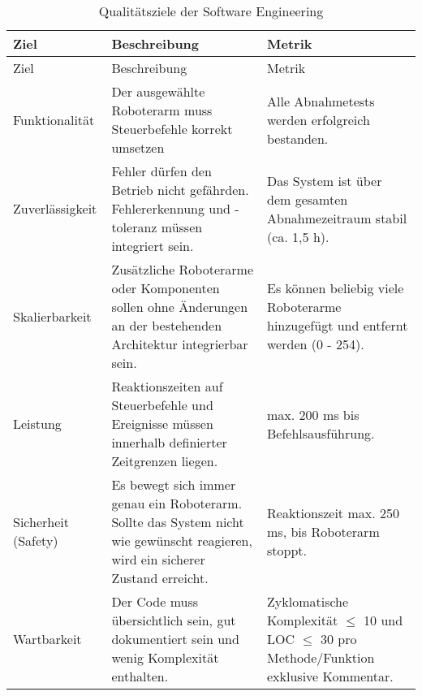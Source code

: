 \begin{longtable}{|>{\raggedright\arraybackslash}p{4cm}|>{\raggedright\arraybackslash}p{5cm}|>{\raggedright\arraybackslash}p{5cm}|}
	\caption{Qualitätsziele der Software Engineering} \label{tab:seziele} \\
	\hline
	Ziel & Beschreibung & Metrik \\
	\hline
	\endfirsthead
	
	\hline
	Ziel & Beschreibung & Metrik \\
	\hline
	\endhead
	
	\hline  
	\endfoot
   
        Funktionalität &  
        Der ausgewählte Roboterarm muss Steuerbefehle korrekt umsetzen
        & Alle Abnahmetests werden erfolgreich bestanden.
        \\
        \hline
        Zuverlässigkeit & 
        Fehler dürfen den Betrieb nicht gefährden. Fehlererkennung und -toleranz müssen integriert sein.
        & Das System ist über dem gesamten Abnahmezeitraum stabil (ca. 1,5 h).
        \\
        \hline
        Skalierbarkeit & 
        Zusätzliche Roboterarme oder Komponenten sollen ohne Änderungen an der bestehenden Architektur integrierbar sein. 
        & Es können beliebig viele Roboterarme hinzugefügt und entfernt werden (0 - 254).
        \\
        \hline
        Leistung & 
        Reaktionszeiten auf Steuerbefehle und Ereignisse müssen innerhalb definierter Zeitgrenzen liegen. 
        & max. 200 ms bis Befehlsausführung.
        \\
        \hline
        Sicherheit (Safety) & 
        Es bewegt sich immer genau ein Roboterarm. Sollte das System nicht wie gewünscht reagieren, wird ein sicherer Zustand erreicht.
        & Reaktionszeit max. 250 ms, bis Roboterarm stoppt.
        \\
        \hline
        Wartbarkeit & 
        Der Code muss übersichtlich sein, gut dokumentiert sein und wenig Komplexität enthalten. 
        & Zyklomatische Komplexität $\leq$ 10 und LOC $\leq$ 30 pro Methode/Funktion exklusive Kommentar. \\
        \hline

\end{longtable}
